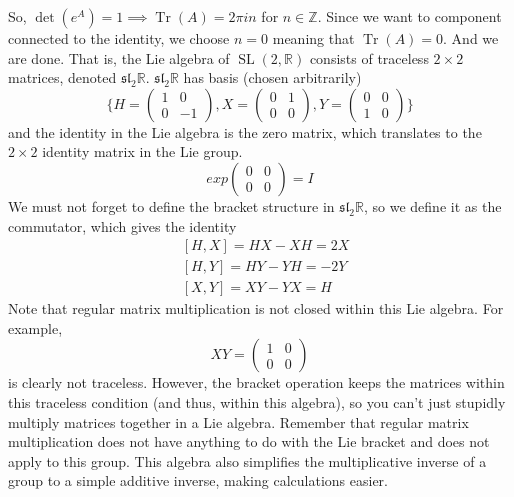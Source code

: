 \documentclass{article}
\DeclareMathOperator{\Tr}{Tr}
\DeclareMathOperator{\SL}{SL}
\begin{document}
      So, $\det{(e^A)} = 1 \implies \Tr{(A)} = 2 \pi i n$ for $n \in \mathbb{Z}$. Since we want to component connected to the identity, we choose $n=0$ meaning that $\Tr{(A)} = 0$. And we are done. That is, the Lie algebra of $\SL(2, \mathbb{R})$ consists of traceless $2 \times 2$ matrices, denoted $\mathfrak{sl}_2 \mathbb{R}$. $\mathfrak{sl}_2 \mathbb{R}$ has basis (chosen arbitrarily) 
      \begin{equation}
        \bigg\{ H = \begin{pmatrix}
        1&0\\0&-1
        \end{pmatrix}, X = \begin{pmatrix}
        0&1\\0&0
        \end{pmatrix}, Y = \begin{pmatrix}
        0&0\\1&0
        \end{pmatrix}\bigg\}
      \end{equation}
      and the identity in the Lie algebra is the zero matrix, which translates to the $2 \times 2$ identity matrix in the Lie group. 
      \begin{equation}
        exp \begin{pmatrix}
        0&0\\0&0
        \end{pmatrix} = I
      \end{equation}
      We must not forget to define the bracket structure in $\mathfrak{sl}_2 \mathbb{R}$, so we define it as the commutator, which gives the identity
      \begin{align*}
        & [H,X] = HX - XH = 2X \\
        & [H,Y] = HY - YH = -2Y \\
        & [X,Y] = XY - YX = H
      \end{align*}
      Note that regular matrix multiplication is not closed within this Lie algebra. For example, 
      \begin{equation}
        X Y = \begin{pmatrix}
        1&0\\0&0
        \end{pmatrix}
      \end{equation}
      is clearly not traceless. However, the bracket operation keeps the matrices within this traceless condition (and thus, within this algebra), so you can't just stupidly multiply matrices together in a Lie algebra. Remember that regular matrix multiplication does not have anything to do with the Lie bracket and does not apply to this group. This algebra also simplifies the multiplicative inverse of a group to a simple additive inverse, making calculations easier. 
\end{document}
